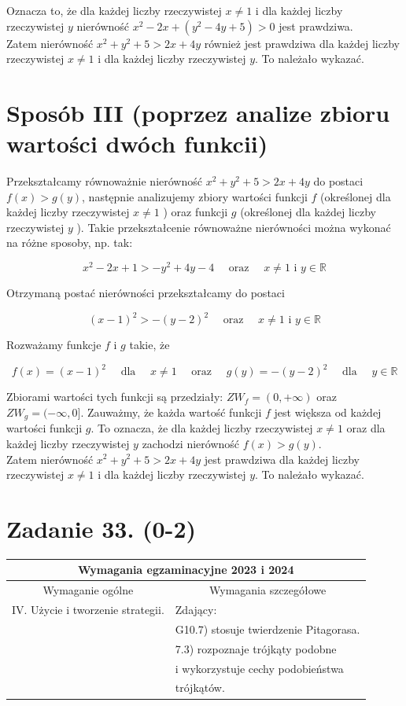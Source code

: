 \documentclass[10pt]{article}
\begin{document}
Oznacza to, że dla każdej liczby rzeczywistej $x \neq 1$ i dla każdej liczby rzeczywistej $y$ nierówność $x^{2}-2 x+\left(y^{2}-4 y+5\right)>0$ jest prawdziwa.\\
Zatem nierówność $x^{2}+y^{2}+5>2 x+4 y$ również jest prawdziwa dla każdej liczby rzeczywistej $x \neq 1$ i dla każdej liczby rzeczywistej $y$. To należało wykazać.

\section*{Sposób III (poprzez analize zbioru wartości dwóch funkcii)}
Przekształcamy równoważnie nierówność $x^{2}+y^{2}+5>2 x+4 y$ do postaci\\
$f(x)>g(y)$, następnie analizujemy zbiory wartości funkcji $f$ (określonej dla każdej liczby rzeczywistej $x \neq 1$ ) oraz funkcji $g$ (określonej dla każdej liczby rzeczywistej $y$ ). Takie przekształcenie równoważne nierówności można wykonać na różne sposoby, np. tak:

$$
x^{2}-2 x+1>-y^{2}+4 y-4 \quad \text { oraz } \quad x \neq 1 \text { i } y \in \mathbb{R}
$$

Otrzymaną postać nierówności przekształcamy do postaci

$$
(x-1)^{2}>-(y-2)^{2} \quad \text { oraz } \quad x \neq 1 \text { i } y \in \mathbb{R}
$$

Rozważamy funkcje $f$ i $g$ takie, że

$$
f(x)=(x-1)^{2} \quad \text { dla } \quad x \neq 1 \quad \text { oraz } \quad g(y)=-(y-2)^{2} \quad \text { dla } \quad y \in \mathbb{R}
$$

Zbiorami wartości tych funkcji są przedziały: $Z W_{f}=(0,+\infty)$ oraz $Z W_{g}=(-\infty, 0]$. Zauważmy, że każda wartość funkcji $f$ jest większa od każdej wartości funkcji $g$. To oznacza, że dla każdej liczby rzeczywistej $x \neq 1$ oraz dla każdej liczby rzeczywistej $y$ zachodzi nierówność $f(x)>g(y)$.\\
Zatem nierówność $x^{2}+y^{2}+5>2 x+4 y$ jest prawdziwa dla każdej liczby rzeczywistej $x \neq 1$ i dla każdej liczby rzeczywistej $y$. To należało wykazać.

\section*{Zadanie 33. (0-2)}
\begin{center}
\begin{tabular}{|l|l|}
\hline
\multicolumn{2}{|c|}{Wymagania egzaminacyjne 2023 i 2024} \\
\hline
\multicolumn{1}{|c|}{Wymaganie ogólne} & \multicolumn{1}{c|}{Wymagania szczegółowe} \\
\hline
IV. Użycie i tworzenie strategii. & Zdający: \\
 & G10.7) stosuje twierdzenie Pitagorasa. \\
 & 7.3) rozpoznaje trójkąty podobne \\
 & i wykorzystuje cechy podobieństwa \\
 & trójkątów. \\
\hline
\end{tabular}
\end{center}
\end{document}
